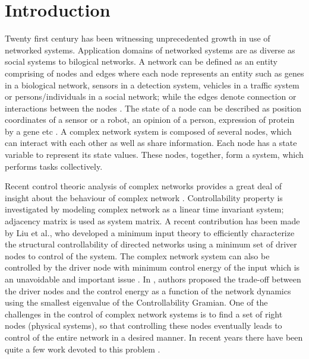 \documentclass[conference]{IEEEtran}
\begin{document}
\section{Introduction}
\par Twenty first century has been witnessing unprecedented growth in use of networked systems. Application domains of networked systems are as diverse as social systems to bilogical networks. A network can be defined as an entity comprising of nodes and edges where each node represents an entity such as genes in a biological network, sensors in a detection system, vehicles in a traffic system or persons/individuals in a social network; while the edges denote connection or interactions between the nodes \cite{liu2011controllability}. The state of a node can be described as position coordinates of a sensor or a robot, an opinion of a person, expression of protein by a gene etc \cite{yan2012controlling}. A complex network system is composed of several nodes, which can interact with each other as well as share information. Each node has a state variable to represent its state values. These nodes, together, form a system, which performs tasks collectively.

\par Recent control theoric analysis of complex networks provides a great deal of insight about the behaviour of complex network \cite{liu2011controllability,yan2012controlling,controllabilityPRL2007, controllabilitytransitionPRL2013, networkcontrollabilityPRL2014}. Controllability property is investigated by modeling complex network as a linear time invariant system; adjacency matrix is used as system matrix. A recent contribution has been made by Liu et al.\cite{liu2011controllability}, who developed a minimum input theory to efficiently characterize the structural controllability of directed networks using a minimum set of driver nodes to control of the system. The complex network system can also be controlled by the driver node with minimum control energy of the input which is an unavoidable and important issue \cite{Bullo2013controllability}. In \cite{Bullo2013controllability}, authors proposed the trade-off between the driver nodes and  the control energy as a function of the network dynamics using the smallest eigenvalue of the Controllability Gramian. One of the challenges in the control of complex network systems is to find a set of  right nodes (physical systems), so that controlling these nodes eventually leads to control of the entire network in a desired manner. In recent years there have been quite a few work devoted to this problem \cite{liu2011controllability,yan2012controlling,rahmani2009controllability,controllabilityPRL2007, controllabilitytransitionPRL2013, networkcontrollabilityPRL2014, optimizingcontrollabilityPRL2012}.
\end{document}

